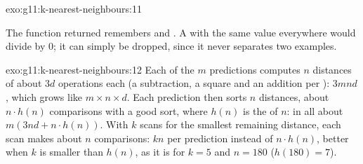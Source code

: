 \begin{solution}{exo:g11:k-nearest-neighbours:11}
\smallskip\noindent\hspace*{2em}

\noindent\hspace*{4em}

\noindent\hspace*{4em}

\noindent\hspace*{4em}

\noindent\hspace*{4em}

\noindent\hspace*{6em}

\noindent\hspace*{10em}

\noindent\hspace*{4em}

\smallskip\noindent The function returned remembers  and . A  with the same value everywhere
would divide by $0$; it can simply be dropped, since it never separates two examples.
\end{solution}

\begin{solution}{exo:g11:k-nearest-neighbours:12}
Each of the $m$ predictions computes $n$ distances of about $3d$ operations each (a subtraction, a square and an
addition per ): $3mnd$, which grows like $m \times n \times d$. Each prediction then sorts $n$ distances, about
$n \cdot h(n)$ comparisons with a good sort, where $h(n)$ is the  of $n$: in all about
$m(3nd + n \cdot h(n))$. With $k$ scans for the smallest remaining distance, each scan makes about $n$ comparisons:
$kn$ per prediction instead of $n \cdot h(n)$, better when $k$ is smaller than $h(n)$, as it is for $k = 5$ and
$n = 180$ ($h(180) = 7$).
\end{solution}

